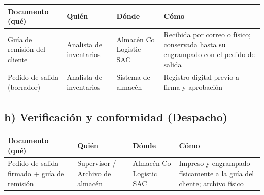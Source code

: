 \documentclass[11pt, a4paper, oneside]{report}
\begin{document}
\begin{table}[H]
\centering\small
\renewcommand{\arraystretch}{1.25}
\setlength{\tabcolsep}{5pt}
\begin{tabularx}{\textwidth}{|>{\raggedright\arraybackslash}X|>{\raggedright\arraybackslash}p{}|>{\raggedright\arraybackslash}p{}|>{\raggedright\arraybackslash}X|}
\hline
\rowcolor{upeu_mid}
\color{white}\bfseries Documento (qué) & \color{white}\bfseries Quién & \color{white}\bfseries Dónde & \color{white}\bfseries Cómo \\ \hline
\rowcolor{gray!10}
Guía de remisión del cliente & Analista de inventarios & Almacén Co Logistic SAC & Recibida por correo o físico; conservada hasta su engrampado con el pedido de salida \\ \hline
Pedido de salida (borrador) & Analista de inventarios & Sistema de almacén & Registro digital previo a firma y aprobación \\ \hline
\end{tabularx}
\end{table}

\subsection*{h) Verificación y conformidad (Despacho)}

\begin{table}[H]
\centering\small
\renewcommand{\arraystretch}{1.25}
\setlength{\tabcolsep}{5pt}
\begin{tabularx}{\textwidth}{|>{\raggedright\arraybackslash}X|>{\raggedright\arraybackslash}p{}|>{\raggedright\arraybackslash}p{}|>{\raggedright\arraybackslash}X|}
\hline
\rowcolor{upeu_mid}
\color{white}\bfseries Documento (qué) & \color{white}\bfseries Quién & \color{white}\bfseries Dónde & \color{white}\bfseries Cómo \\ \hline
\rowcolor{gray!10}
Pedido de salida firmado + guía de remisión & Supervisor / Archivo de almacén & Almacén Co Logistic SAC & Impreso y engrampado físicamente a la guía del cliente; archivo físico \\ \hline
\end{tabularx}
\end{table}
\end{document}
